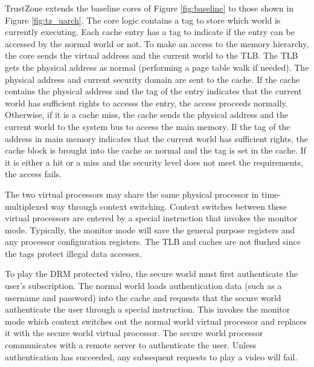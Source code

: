     TrustZone extends the baseline cores of Figure \ref{fig:baseline} to
    those shown in Figure \ref{fig:tz_uarch}. The core logic contains a tag to 
    store which world is currently executing. Each cache entry has a tag to 
    indicate if the entry can be accessed by the normal world or not. To make 
    an access to the memory hierarchy, the core sends the virtual address and 
    the current world to the TLB. The TLB gets the physical address as normal 
    (performing a page table walk if needed). The physical address and current 
    security domain are sent to the cache. If the cache contains the physical 
    address and the tag of the entry indicates that the current world has 
    sufficient rights to accesss the entry, the access proceeds normally.  
    Otherwise, if it is a cache miss, the cache sends the physical address and 
    the current world to the system bus to access the main memory. If the tag 
    of the address in main memory indicates that the current world has 
    sufficient rights, the cache block is brought into the cache as normal and 
    the tag is set in the cache. If it is either a hit or a miss and the 
    security level does not meet the requirements, the access fails.

    The two virtual processors may share the same physical processor in 
    time-multiplexed way through context switching. Context switches between 
    these virtual processors are entered by a special instruction that invokes 
    the monitor mode.  Typically, the monitor mode will save the general 
    purpose registers and any processor configuration registers. The TLB and 
    caches are not flushed since the tags protect illegal data accesses.

    To play the DRM protected video, the secure world must first authenticate 
    the user's subscription. The normal world loads authentication data (such 
    as a username and password) into the cache and requests that the secure 
    world authenticate the user through a special instruction. This invokes the 
    monitor mode which context switches out the normal world virtual processor 
    and replaces it with the secure world virtual processor. The secure world 
    processor communicates with a remote server to authenticate the user.  
    Unless authentication has succeeded, any subsequent requests to play a 
    video will fail.


